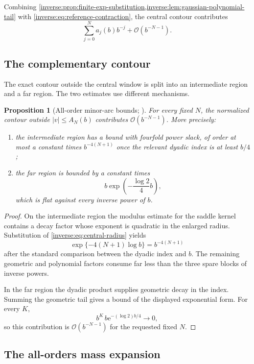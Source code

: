 \documentclass[11pt,oneside]{article}
\newtheorem{proposition}[proposition]{Proposition}
\theoremstyle{definition}
\theoremstyle{remark}
\newcommand{\e}{\mathrm e}
\newcommand{\bigO}{\mathcal O}
\begin{document}
Combining \cref{inverse:prop:finite-exp-substitution,inverse:lem:gaussian-polynomial-tail}
with \eqref{inverse:eq:reference-contraction}, the central contour contributes
\begin{equation}
 \sum_{j=0}^{N}a_j(b)b^{-j}+\bigO(b^{-N-1}).
 \label{inverse:eq:central-mass-expansion}
\end{equation}

\subsection{The complementary contour}

The exact contour outside the central window is split into an intermediate
region and a far region.  The two estimates use different mechanisms.

\begin{proposition}[All-order minor-arc bounds; \Formalized]
\label{inverse:prop:minor-arcs}
For every fixed $N$, the normalized contour outside
$|v|\leq A_N(b)$ contributes $\bigO(b^{-N-1})$.
More precisely:
\begin{enumerate}
\item the intermediate region has a bound with fourfold power slack,
of order at most a constant times $b^{-4(N+1)}$ once the relevant
dyadic index is at least $b/4$;
\item the far region is bounded by a constant times
\[
 b\exp\!\left(-\frac{\log2}{4}b\right),
\]
which is flat against every inverse power of $b$.
\end{enumerate}
\end{proposition}

\begin{proof}
On the intermediate region the modulus estimate for the saddle kernel
contains a decay factor whose exponent is quadratic in the enlarged
radius.  Substitution of \eqref{inverse:eq:central-radius} yields
\[
 \exp\{-4(N+1)\log b\}=b^{-4(N+1)}
\]
after the standard comparison between the dyadic index and $b$.  The
remaining geometric and polynomial factors consume far less than the
three spare blocks of inverse powers.

In the far region the dyadic product supplies geometric decay in the
index.  Summing the geometric tail gives a bound of the displayed
exponential form.  For every $K$,
\[
 b^K\,b\e^{-(\log2)b/4}\longrightarrow0,
\]
so this contribution is $\bigO(b^{-N-1})$ for the requested fixed $N$.
\end{proof}

\subsection{The all-orders mass expansion}
\end{document}
